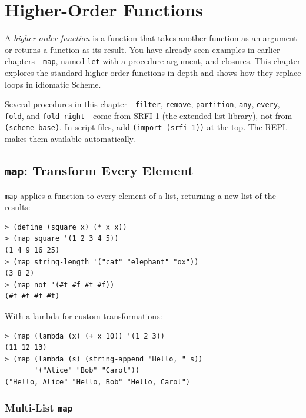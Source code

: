 \chapter{Higher-Order Functions}
\label{ch:hof}

A \emph{higher-order function} is a function that takes another function as an argument or returns a function as its result. You have already seen examples in earlier chapters---\texttt{map}, named \texttt{let} with a procedure argument, and closures. This chapter explores the standard higher-order functions in depth and shows how they replace loops in idiomatic Scheme.

\begin{note}
Several procedures in this chapter---\texttt{filter}, \texttt{remove}, \texttt{partition}, \texttt{any}, \texttt{every}, \texttt{fold}, and \texttt{fold-right}---come from SRFI-1 (the extended list library), not from \texttt{(scheme base)}. In script files, add \texttt{(import (srfi 1))} at the top. The REPL makes them available automatically.
\end{note}

\section{\texttt{map}: Transform Every Element}

\texttt{map} applies a function to every element of a list, returning a new list of the results:

\begin{lstlisting}[style=repl]
> (define (square x) (* x x))
> (map square '(1 2 3 4 5))
(1 4 9 16 25)
> (map string-length '("cat" "elephant" "ox"))
(3 8 2)
> (map not '(#t #f #t #f))
(#f #t #f #t)
\end{lstlisting}

With a lambda for custom transformations:

\begin{lstlisting}[style=repl]
> (map (lambda (x) (+ x 10)) '(1 2 3))
(11 12 13)
> (map (lambda (s) (string-append "Hello, " s))
       '("Alice" "Bob" "Carol"))
("Hello, Alice" "Hello, Bob" "Hello, Carol")
\end{lstlisting}

\subsection{Multi-List \texttt{map}}

